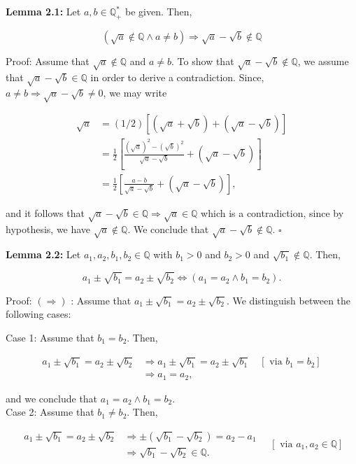 \documentclass[11pt,letterpaper]{article}
\begin{document}
\noindent\textbf{Lemma 2.1:} Let $a, b \in \mathbb{Q}_{+}^{*}$ be given. Then,

\[
(\sqrt{a} \notin \mathbb{Q} \wedge a \neq b) \Longrightarrow \sqrt{a}-\sqrt{b} \notin \mathbb{Q}
\]

Proof: Assume that $\sqrt{a} \notin \mathbb{Q}$ and $a \neq b$. To show that $\sqrt{a}-\sqrt{b} \notin \mathbb{Q}$, we assume that $\sqrt{a}-\sqrt{b} \in \mathbb{Q}$ in order to derive a contradiction. Since, $a \neq b \Longrightarrow \sqrt{a}-\sqrt{b} \neq 0$, we may write

\[
\begin{aligned}
\sqrt{a} & =(1 / 2)[(\sqrt{a}+\sqrt{b})+(\sqrt{a}-\sqrt{b})] \\
& =\frac{1}{2}\left[\frac{(\sqrt{a})^{2}-(\sqrt{b})^{2}}{\sqrt{a}-\sqrt{b}}+(\sqrt{a}-\sqrt{b})\right] \\
& =\frac{1}{2}\left[\frac{a-b}{\sqrt{a}-\sqrt{b}}+(\sqrt{a}-\sqrt{b})\right],
\end{aligned}
\]

and it follows that $\sqrt{a}-\sqrt{b} \in \mathbb{Q} \Longrightarrow \sqrt{a} \in \mathbb{Q}$ which is a contradiction, since by hypothesis, we have $\sqrt{a} \notin \mathbb{Q}$. We conclude that $\sqrt{a}-\sqrt{b} \notin \mathbb{Q}$. \(\square\)

\noindent\textbf{Lemma 2.2:} Let $a_{1}, a_{2}, b_{1}, b_{2} \in \mathbb{Q}$ with $b_{1}>0$ and $b_{2}>0$ and $\sqrt{b_{1}} \notin \mathbb{Q}$. Then,

\[
a_{1} \pm \sqrt{b_{1}}=a_{2} \pm \sqrt{b_{2}} \Longleftrightarrow\left(a_{1}=a_{2} \wedge b_{1}=b_{2}\right) .
\]

Proof: $(\Longrightarrow)$ : Assume that $a_{1} \pm \sqrt{b_{1}}=a_{2} \pm \sqrt{b_{2}}$. We distinguish between the following cases:

Case 1: Assume that $b_{1}=b_{2}$. Then,

\[
\begin{aligned}
a_{1} \pm \sqrt{b_{1}}=a_{2} \pm \sqrt{b_{2}} & \Longrightarrow a_{1} \pm \sqrt{b_{1}}=a_{2} \pm \sqrt{b_{1}} \quad\left[\text { via } b_{1}=b_{2}\right] \\
& \Longrightarrow a_{1}=a_{2},
\end{aligned}
\]

and we conclude that $a_{1}=a_{2} \wedge b_{1}=b_{2}$.\\
Case 2: Assume that $b_{1} \neq b_{2}$. Then,

\[
\begin{aligned}
a_{1} \pm \sqrt{b_{1}}=a_{2} \pm \sqrt{b_{2}} & \Longrightarrow \pm\left(\sqrt{b_{1}}-\sqrt{b_{2}}\right)=a_{2}-a_{1} \\
& \Longrightarrow \sqrt{b_{1}}-\sqrt{b_{2}} \in \mathbb{Q} .
\end{aligned} \quad\left[\text { via } a_{1}, a_{2} \in \mathbb{Q}\right]
\]
\end{document}
